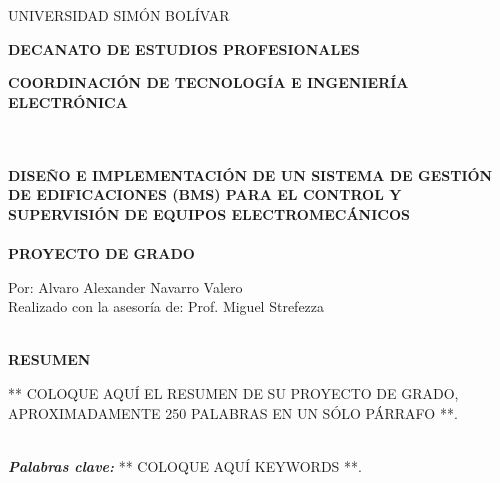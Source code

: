 \watermarkoff
\begin{resumen}
\begin{center}
\begin{large}
	UNIVERSIDAD SIMÓN BOLÍVAR
\end{large}

\textbf{DECANATO DE ESTUDIOS PROFESIONALES}

\textbf{COORDINACIÓN DE TECNOLOGÍA E INGENIERÍA ELECTRÓNICA}

~\\
~\\
\textbf{DISEÑO E IMPLEMENTACIÓN DE UN SISTEMA DE GESTIÓN DE EDIFICACIONES (BMS) PARA EL CONTROL Y SUPERVISIÓN DE EQUIPOS ELECTROMECÁNICOS}
~\\
~\\
\textbf{PROYECTO DE GRADO}


Por: Alvaro Alexander Navarro Valero\\
Realizado con la asesoría de: Prof. Miguel Strefezza

~\\

\textbf{RESUMEN}
\end{center}



** COLOQUE AQUÍ EL RESUMEN DE SU PROYECTO DE GRADO, APROXIMADAMENTE 250 PALABRAS EN UN SÓLO PÁRRAFO **.

~\\
\textit{\textbf{Palabras clave:}} ** COLOQUE AQUÍ KEYWORDS **.

\end{resumen}